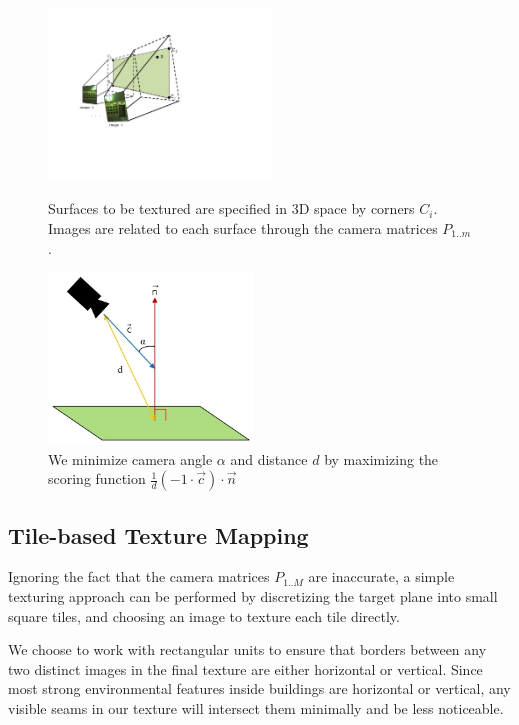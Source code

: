 \documentclass[]{spie}  %
\begin{document}
\begin{figure}
  \begin{minipage}[b]{0.45\linewidth}
    \centering
    \includegraphics[height=1.8in]{Projection.pdf}
    \caption{Surfaces to be textured are specified in 3D space by
      corners $C_i$. Images are related to each surface through the
      camera matrices $P_{1..m}$. }
    \label{fig:projection}
  \end{minipage}
  \hspace{0.5cm}
  \begin{minipage}[b]{0.45\linewidth}
    \centering
    \includegraphics[height=1.8in]{scoringFunction.jpg}
    \caption{We minimize camera angle $\alpha$ and distance $d$ by
      maximizing the scoring function $\frac{1}{d} (-1 \cdot \vec{c})
      \cdot \vec{n}$}
    \label{fig:scoringFunction}
  \end{minipage}
\end{figure}


\subsection{Tile-based Texture Mapping}
\label{sec:tileBasedMapping}
Ignoring the fact that the camera matrices $P_{1..M}$ are inaccurate,
a simple texturing approach can be performed by discretizing the
target plane into small square tiles, and choosing an image to texture
each tile directly.

We choose to work with rectangular units to ensure that borders
between any two distinct images in the final texture are either
horizontal or vertical. Since most strong environmental features
inside buildings are horizontal or vertical, any visible seams in our
texture will intersect them minimally and be less noticeable.
\end{document}
